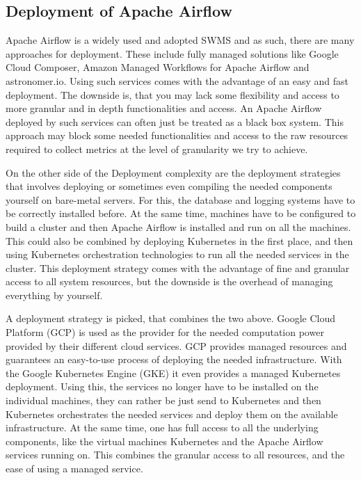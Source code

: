 \documentclass[lettersize,journal]{IEEEtran}
\begin{document}
	
	\subsection{Deployment of Apache Airflow}
	Apache Airflow is a widely used and adopted SWMS and as such, there are many approaches for deployment. These include fully managed solutions like Google Cloud Composer, Amazon Managed Workflows for Apache Airflow and astronomer.io. Using such services comes with the advantage of an easy and fast deployment. The downside is, that you may lack some flexibility and access to more granular and in depth functionalities and access. An Apache Airflow deployed by such services can often just be treated as a black box system. This approach may block some needed functionalities and access to the raw resources required to collect metrics at the level of granularity we try to achieve.
	
	On the other side of the Deployment complexity are the deployment strategies that involves deploying or sometimes even compiling the needed components yourself on bare-metal servers. For this, the database and logging systems have to be correctly installed before. At the same time, machines have to be configured to build a cluster and then Apache Airflow is installed and run on all the machines. This could also be combined by deploying Kubernetes in the first place, and then using Kubernetes orchestration technologies to run all the needed services in the cluster. This deployment strategy comes with the advantage of fine and granular access to all system resources, but the downside is the overhead of managing everything by yourself. 
	
	A deployment strategy is picked, that combines the two above. Google Cloud Platform (GCP) is used as the provider for the needed computation power provided by their different cloud services. GCP provides managed resources and guarantees an easy-to-use process of deploying the needed infrastructure. With the Google Kubernetes Engine (GKE) it even provides a managed Kubernetes deployment. Using this, the services no longer have to be installed on the individual machines, they can rather be just send to Kubernetes and then Kubernetes orchestrates the needed services and deploy them on the available infrastructure. At the same time, one has full access to all the underlying components, like the virtual machines Kubernetes and the Apache Airflow services running on. This combines the granular access to all resources, and the ease of using a managed service.
	
\end{document}
